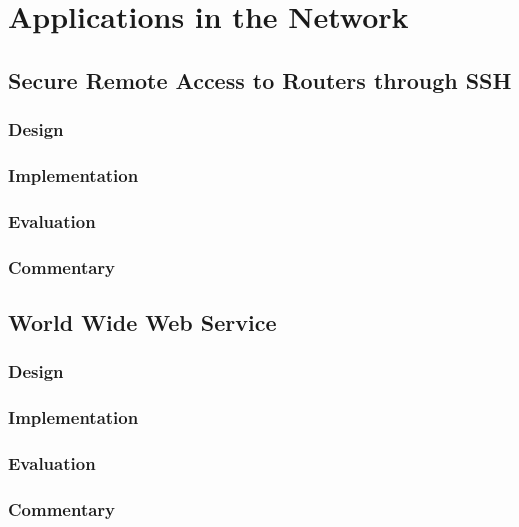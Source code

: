 \chapter{Applications in the Network}
\label{chap:applications}

\section{Secure Remote Access to Routers through SSH}

\subsection{Design}

\subsection{Implementation}

\subsection{Evaluation}

\subsection{Commentary}



\section{World Wide Web Service}

\subsection{Design}

\subsection{Implementation}

\subsection{Evaluation}

\subsection{Commentary}



